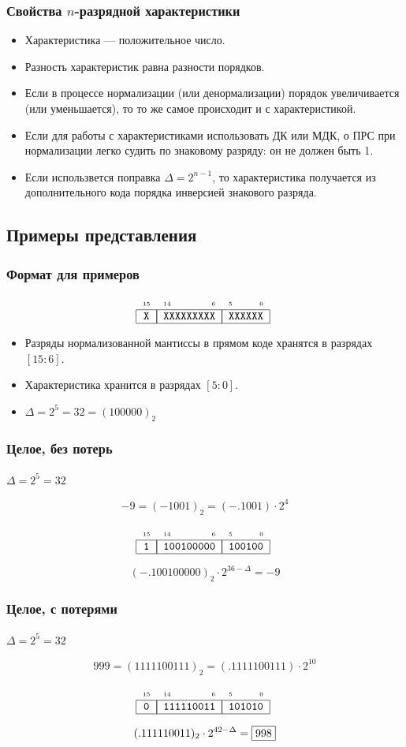 \begin{frame}
    \frametitle{Свойства $n$-разрядной характеристики}

    \begin{itemize}
        \item Характеристика --- положительное число.
        \item Разность характеристик равна разности порядков.
        \item Если в процессе нормализации (или денормализации) порядок увеличивается (или уменьшается), то то же самое происходит и с характеристикой.
        \item Если для работы с характеристиками использовать ДК или МДК, о ПРС при нормализации легко судить по знаковому разряду: он не должен быть 1.
        \item Если использвется поправка $\Delta=2^{n-1}$, то характеристика получается из дополнительного кода порядка инверсией знакового разряда.
    \end{itemize}
\end{frame}


\subsection{Примеры представления}


\begin{frame}
    \frametitle{Формат для примеров}

    \[
        \FloatMyCharHex{X}{XXXXXXXXX}{XXXXXX}
    \]
    \begin{itemize}
        \item Разряды нормализованной мантиссы в прямом коде хранятся в разрядах $[15:6]$.
        \item Характеристика хранится в разрядах $[5:0]$.
        \item $\Delta=2^5=32=(100000)_2$
    \end{itemize}
\end{frame}

\begin{frame}
    \frametitle{Целое, без потерь}
    \framesubtitle{$\Delta=2^5=32$}
    \[
        -9=(-1001)_2=(-.1001)\cdot 2^{4}
    \]
    
    \[
        \FloatMyCharHex{1}{100100000}{100100}
    \]
    
    \[
        (-.100100000)_2\cdot 2^{36-\Delta}=-9
    \]
\end{frame}

\begin{frame}
    \frametitle{Целое, с потерями}
    \framesubtitle{$\Delta=2^5=32$}
    \[
        999=(1111100111)_2=(.1111100111)\cdot 2^{10}
    \]
    
    \[
        \FloatMyCharHex{0}{111110011}{101010}
    \]
    
    \[
        (.111110011)_2\cdot 2^{42-\Delta}=\fbox{998}
    \]
\end{frame}

